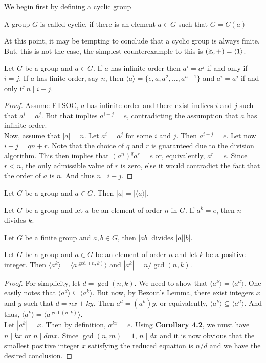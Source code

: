 We begin first by defining a cyclic group
\begin{definition}
	A group $G$ is called cyclic, if there is an element $a\in G$ such that $G=C(a)$
\end{definition}
At this point, it may be tempting to conclude that a cyclic group is always finite. But, this is not the case, the simplest counterexample to this is $(\mathbb{Z},+)=\langle1\rangle$.
\begin{proposition}
	Let $G$ be a group and $a\in G$. If $a$ has infinite order then $a^i=a^j$ if and only if $i=j$. If $a$ has finite order, say $n$, then $\langle a\rangle = \{e,a,a^2,\ldots,a^{n-1}\}$ and $a^i=a^j$ if and only if $n\mid i-j$. 
\end{proposition}
\begin{proof}
	Assume FTSOC, $a$ has infinite order and there exist indices $i$ and $j$ such that $a^i=a^j$. But that implies $a^{i-j}=e$, contradicting the assumption that $a$ has infinite order.\\
	Now, assume that $|a|=n$. Let $a^i=a^j$ for some $i$ and $j$. Then $a^{i-j}=e$. Let now $i-j=qn+r$. Note that the choice of $q$ and $r$ is guaranteed due to the division algorithm. This then implies that $(a^{n})^{q}a^r=e$ or, equivalently, $a^r=e$. Since $r<n$, the only admissible value of $r$ is zero, else it would contradict the fact that the order of $a$ is $n$. And thus $n\mid i-j$.
\end{proof}
\begin{corollary}
	Let $G$ be a group and $a\in G$. Then $|a|=|\langle a\rangle|$.
\end{corollary}
\begin{corollary}
	Let $G$ be a group and let $a$ be an element of order $n$ in $G$. If $a^k=e$, then $n$ divides $k$.
\end{corollary}
\begin{corollary}
	Let $G$ be a finite group and $a,b\in G$, then $|ab|$ divides $|a||b|$.
\end{corollary}

\begin{proposition}
	Let $G$ be a group and $a\in G$ be an element of order $n$ and let $k$ be a positive integer. Then $\langle a^k\rangle = \langle a^{\gcd(n,k)}\rangle$ and $|a^k|=n/\gcd(n,k)$.
\end{proposition}
\begin{proof}
	For simplicity, let $d=\gcd(n,k)$. We need to show that $\langle a^k\rangle=\langle a^d\rangle$. One easily notes that $\langle a^d\rangle\subseteq\langle a^k\rangle$. But now, by Bezout's Lemma, there exist integers $x$ and $y$ such that $d=nx+ky$. Then $a^d=(a^k)y$, or equivalently, $\langle a^k\rangle\subseteq\langle a^d\rangle$. And thus, $\langle a^k\rangle = \langle a^{\gcd(n,k)}\rangle$.\\
	Let $|a^k|=x$. Then by definition, $a^{kx}=e$. Using \textbf{Corollary 4.2}, we must have $n\mid kx$ or $n\mid dmx$. Since $\gcd(n,m)=1$, $n\mid dx$ and it is now obvious that the smallest positive integer $x$ satisfying the reduced equation is $n/d$ and we have the desired conclusion.
\end{proof}

